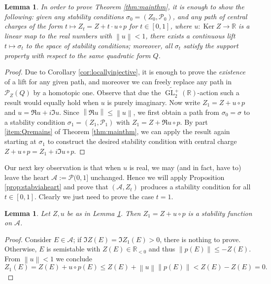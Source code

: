 \documentclass[leqno,11pt,twoside]{amsart}
\newtheorem{Lem}[Thm]{Lemma}
\theoremstyle{definition}
\begin{document}
\begin{Lem} \label{lem:onlyreal}
In order to prove Theorem \ref{thm:mainthm}, it is enough to show
the following: given any stability conditions $\sigma_0 = (Z_0, {\ensuremath{\mathcal P}}_0)$, and any path
of central charges of the form  $t \mapsto Z_t = Z + t \cdot u \circ p$ for $t \in [0,1]$, where $u \colon
{\mathop{\mathrm{Ker}}\nolimits} Z \to {\ensuremath{\mathbb{R}}}$ is a linear map to the \emph{real numbers} with ${\left\|{u}\right\|} < 1$, there exists a
continuous lift $t \mapsto \sigma_t$ to the space of stability conditions; moreover, all $\sigma_t$ satisfy the support
property with respect to the same quadratic form $Q$.
\end{Lem}
\begin{proof}
Due to Corollary \ref{cor:locallyinjective}, it is enough to prove the \emph{existence} of a lift for any given path, and moreover we can freely replace any path in ${\ensuremath{\mathcal P}}_Z(Q)$ by a homotopic one. 
Observe that due the $\widetilde{{\mathop{\mathrm{GL}}\nolimits}_2^+}({\ensuremath{\mathbb{R}}})$-action such a result would equally hold when $u$ is purely
imaginary.  Now write $Z_1 = Z + u \circ p$ and $u = \Re u + i \Im u$. Since ${\left\|{\Re u}\right\|} \le {\left\|{u}\right\|}$, we first obtain
a path from $\sigma_0 = \sigma$ to a stability condition $\sigma_1 = (Z_1, {\ensuremath{\mathcal P}}_1)$ with
$Z_1 = Z + \Re u \circ p$. By part \eqref{item:Qremains} of Theorem \ref{thm:mainthm}, we can apply the result again starting at $\sigma_1$ to construct the desired
stability condition with central charge $Z + u\circ p = Z_1 + i \Im u \circ p$.
\end{proof}

Our next key observation is that when 
$u$ is real, we may (and in fact, have to) leave the heart ${\ensuremath{\mathcal A}} := {\ensuremath{\mathcal P}}(0, 1]$ unchanged. Hence we
will apply Proposition \ref{prop:stabviaheart} and prove
that $({\ensuremath{\mathcal A}}, Z_t)$ produces a stability condition for all $t \in [0, 1]$.
Clearly we just need to prove the case $t = 1$. 
\begin{Lem} Let $Z, u$ be as in Lemma \ref{lem:onlyreal}. Then $Z_1 = Z + u \circ p$ is a stability
function on ${\ensuremath{\mathcal A}}$.
\end{Lem}
\begin{proof} Consider $E \in {\ensuremath{\mathcal A}}$; if $\Im Z(E) = \Im Z_1(E) > 0$, there is nothing to prove.
Otherwise, $E$ is semistable with $Z(E) \in {\ensuremath{\mathbb{R}}}_{<0}$ and thus ${\left\|{p(E)}\right\|} \le - Z(E)$.  From
 ${\left\|{u}\right\|} < 1$ we conclude
\[
Z_1(E) = Z(E) + u\circ p(E) \le Z(E) + {\left\|{u}\right\|} {\left\|{p(E)}\right\|}  < Z(E) - Z(E) = 0. 
\]
\end{proof}
\end{document}
